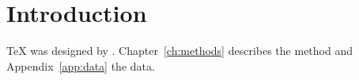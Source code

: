 \chapter{Introduction}\label{ch:intro}
\TeX{} was designed by \citet{knuth1984}. Chapter~\ref{ch:methods}
describes the method and Appendix~\ref{app:data} the data.
